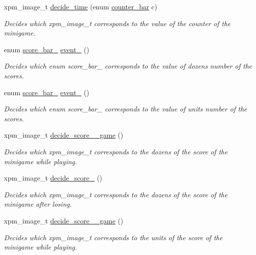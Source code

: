 \begin{DoxyCompactItemize}
xpm\+\_\+image\+\_\+t \hyperlink{group__loading__xpms_ga5dbbff5de875a1305fdf7ed265fc73c8}{decide\+\_\+time} (enum \hyperlink{group__types_gad48fe05a3e5df355707b5a3fd6cf9d8e}{counter\+\_\+bar} c)
\begin{DoxyCompactList}\small\item\em Decides which xpm\+\_\+image\+\_\+t corresponds to the value of the counter of the minigame. \end{DoxyCompactList}\item 
enum \hyperlink{group__types_gabd8d88ed6ba2aef17eb45496d20be732}{score\+\_\+bar\+\_} \hyperlink{group__loading__xpms_gac00aab23f7677ce5eee5748c335c994f}{event\+\_} ()
\begin{DoxyCompactList}\small\item\em Decides which enum score\+\_\+bar\+\_ corresponds to the value of dozens number of the scores. \end{DoxyCompactList}\item 
enum \hyperlink{group__types_gab5d0fdad1621cc17d1147dedd2e7a773}{score\+\_\+bar\+\_} \hyperlink{group__loading__xpms_ga70f5397af0d313815b96cf662cd48f65}{event\+\_} ()
\begin{DoxyCompactList}\small\item\em Decides which enum score\+\_\+bar\+\_ corresponds to the value of units number of the scores. \end{DoxyCompactList}\item 
xpm\+\_\+image\+\_\+t \hyperlink{group__loading__xpms_ga2427af4195752a8d1c1f52ec6ade7735}{decide\+\_\+score\+\_\+\_\+game} ()
\begin{DoxyCompactList}\small\item\em Decides which xpm\+\_\+image\+\_\+t corresponds to the dozens of the score of the minigame while playing. \end{DoxyCompactList}\item 
xpm\+\_\+image\+\_\+t \hyperlink{group__loading__xpms_ga3ff28b6df0ced24968db40bec439452e}{decide\+\_\+score\+\_} ()
\begin{DoxyCompactList}\small\item\em Decides which xpm\+\_\+image\+\_\+t corresponds to the dozens of the score of the minigame after losing. \end{DoxyCompactList}\item 
xpm\+\_\+image\+\_\+t \hyperlink{group__loading__xpms_ga5808a0af7a81c9213427d1173ea4bfdb}{decide\+\_\+score\+\_\+\_\+game} ()
\begin{DoxyCompactList}\small\item\em Decides which xpm\+\_\+image\+\_\+t corresponds to the units of the score of the minigame while playing. \end{DoxyCompactList}\item 

\end{DoxyCompactItemize}
